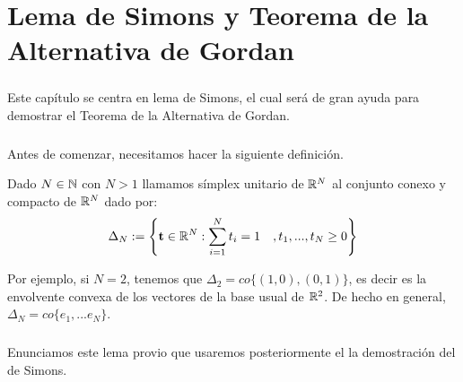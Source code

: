 \chapter{Lema de Simons y Teorema de la Alternativa de Gordan}
	\thispagestyle{empty}
	\paragraph{}Este capítulo se centra en lema de Simons, el cual será de gran ayuda para demostrar el Teorema de la Alternativa de Gordan.

	\paragraph{}Antes de comenzar, necesitamos hacer la siguiente definición.
	
	\begin{definicion}
		Dado $ N \in \mathbb{N} $ con $ N > 1 $ llamamos símplex unitario de $ \mathbb{R}^N $ al conjunto conexo y compacto de $ \mathbb{R}^N $ dado por:
		\begin{equation*}
			\Delta_N := \left\lbrace \mathbf{t} \in \mathbb{R}^N: \sum_{i=1}^{N}{t_i} = 1\quad , t_1,...,t_N \geq 0 \right\rbrace
		\end{equation*}
	\end{definicion}

	Por ejemplo, si $ N = 2 $, tenemos que $ \Delta_2 = co\{(1,0),(0,1)\}$, es decir es la envolvente convexa de los vectores de la base usual de $ \mathbb{R}^2 $. De hecho en general, $ \Delta_N = co\{e_1,...e_N\} $.

	\paragraph{} Enunciamos este lema provio que usaremos posteriormente el la demostración del de Simons.
	

